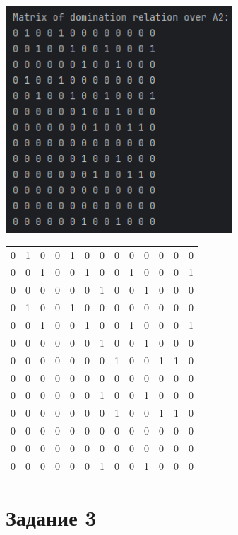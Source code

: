 \documentclass[12pt]{article}
\begin{document}
	\parbox[с][90mm][t]{70mm}{
		\includegraphics[width=85mm]{images/dom2.png}
	}
	\hspace{2cm}
	\parbox[с][90mm][c]{60mm}{
		\begin{tabular} {c c c c c c c c c c c c c }
			0 & 1 & 0 & 0 & 1 & 0 & 0 & 0 & 0 & 0 & 0 & 0 & 0 \\
			0 & 0 & 1 & 0 & 0 & 1 & 0 & 0 & 1 & 0 & 0 & 0 & 1 \\
			0 & 0 & 0 & 0 & 0 & 0 & 1 & 0 & 0 & 1 & 0 & 0 & 0 \\
			0 & 1 & 0 & 0 & 1 & 0 & 0 & 0 & 0 & 0 & 0 & 0 & 0 \\
			0 & 0 & 1 & 0 & 0 & 1 & 0 & 0 & 1 & 0 & 0 & 0 & 1 \\
			0 & 0 & 0 & 0 & 0 & 0 & 1 & 0 & 0 & 1 & 0 & 0 & 0 \\
			0 & 0 & 0 & 0 & 0 & 0 & 0 & 1 & 0 & 0 & 1 & 1 & 0 \\
			0 & 0 & 0 & 0 & 0 & 0 & 0 & 0 & 0 & 0 & 0 & 0 & 0 \\
			0 & 0 & 0 & 0 & 0 & 0 & 1 & 0 & 0 & 1 & 0 & 0 & 0 \\
			0 & 0 & 0 & 0 & 0 & 0 & 0 & 1 & 0 & 0 & 1 & 1 & 0 \\
			0 & 0 & 0 & 0 & 0 & 0 & 0 & 0 & 0 & 0 & 0 & 0 & 0 \\
			0 & 0 & 0 & 0 & 0 & 0 & 0 & 0 & 0 & 0 & 0 & 0 & 0 \\
			0 & 0 & 0 & 0 & 0 & 0 & 1 & 0 & 0 & 1 & 0 & 0 & 0 \\
		\end{tabular}
	}
	
	\section{Задание 3}
	\label{task3}
\end{document}
